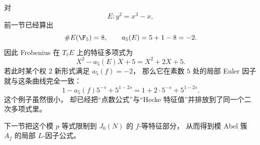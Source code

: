 \begin{example}[再次计算 $E:y^2=x^3-x$ 在 $\F_5$ 上]
\label{ex:ch08-f5-recount}
对
\[
  E\colon y^2=x^3-x,
\]
前一节已经算出
\[
  \#E(\F_5)=8,
  \qquad
  a_5(E)=5+1-8=-2.
\]
因此 Frobenius 在 $T_\ell E$ 上的特征多项式为
\[
  X^2-a_5(E)X+5=X^2+2X+5.
\]
若此时某个权 $2$ 新形式满足 $a_5(f)=-2$，
那么它在素数 $5$ 处的局部 Euler 因子就与这条曲线完全一致：
\[
  1-a_5(f)5^{-s}+5^{1-2s}=1+2\cdot 5^{-s}+5^{1-2s}.
\]
这个例子虽然很小，
却已经把“点数公式”与“Hecke 特征值”并排放到了同一个二次多项式里。
\end{example}

下一节把这个模 $p$ 等式限制到 $J_0(N)$ 的 $f$-等特征部分，
从而得到模 Abel 簇 $A_f$ 的局部 $L$-因子公式。
